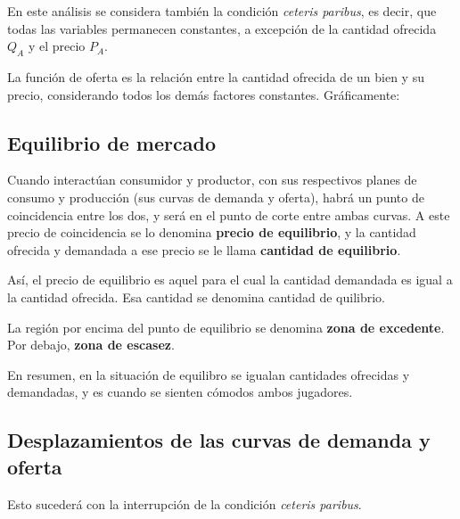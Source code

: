En este análisis se considera también la condición \textit{ceteris paribus},
es decir, 
que todas las variables permanecen constantes,
a excepción de la cantidad ofrecida \(Q_A\) y el precio \(P_A\).

La función de oferta es la relación entre la cantidad ofrecida de un bien y su precio,
considerando todos los demás factores constantes. 
Gráficamente:

\begin{center}
\end{center}

\subsection{Equilibrio de mercado}

Cuando interactúan consumidor y productor,
con sus respectivos planes de consumo y producción
(sus curvas de demanda y oferta),
habrá un punto de coincidencia entre los dos,
y será en el punto de corte entre ambas curvas.
A este precio de coincidencia se lo denomina \textbf{precio de equilibrio},
y la cantidad ofrecida y demandada a ese precio se le llama \textbf{cantidad de equilibrio}.

Así,
el precio de equilibrio es aquel para el cual la cantidad demandada es igual a la cantidad ofrecida.
Esa cantidad se denomina cantidad de quilibrio.

La región por encima del punto de equilibrio se denomina \textbf{zona de excedente}.
Por debajo, \textbf{zona de escasez}.

En resumen, 
en la situación de equilibro se igualan cantidades ofrecidas y demandadas,
y es cuando se sienten cómodos ambos jugadores.

\subsection{Desplazamientos de las curvas de demanda y oferta}

Esto sucederá con la interrupción de la condición \textit{ceteris paribus}.

